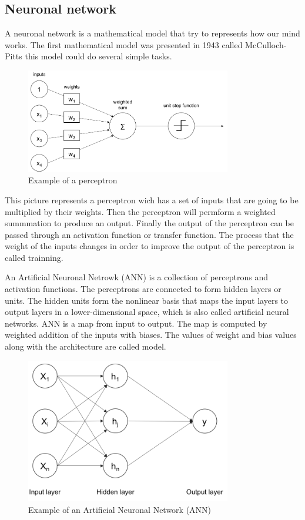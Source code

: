 \subsection[Neuronal network]{Neuronal network}

A neuronal network is a mathematical model that try to represents how our mind works. The first mathematical model was presented in 1943 called McCulloch-Pitts this model could do several simple tasks. \cite{fsancho}

\begin{figure}[H]
\centering
\includegraphics[width=0.8\textwidth]{./figures/perceptron}
\caption{Example of a perceptron \cite{rajalingappaa}}
\end{figure}
	
	
This picture represents a perceptron wich has a set of inputs that are going to be multiplied by their weights.
Then the perceptron will permform a weighted summmation to produce an output. \cite{sagar} Finally the output of the perceptron can be passed through an activation function or transfer function.\cite{rajalingappaa}
The process that the weight of the inputs changes in order to improve the output of the perceptron is called trainning. 

An Artificial Neuronal Netrowk (ANN) is a collection of perceptrons and activation functions. The perceptrons are connected to form hidden layers or units. The hidden units form the nonlinear basis that maps the input layers to output layers in a lower-dimensional space, which is also called artificial neural networks. ANN is a map from input to output. The map is computed by weighted addition of the inputs with biases. The values of weight and bias values along with the architecture are called model.

\begin{figure}[H]
\centering
\includegraphics[width=0.8\textwidth]{./figures/ann}
\caption{Example of an Artificial Neuronal Network (ANN) \cite{rajalingappaa}}
\end{figure}
 
